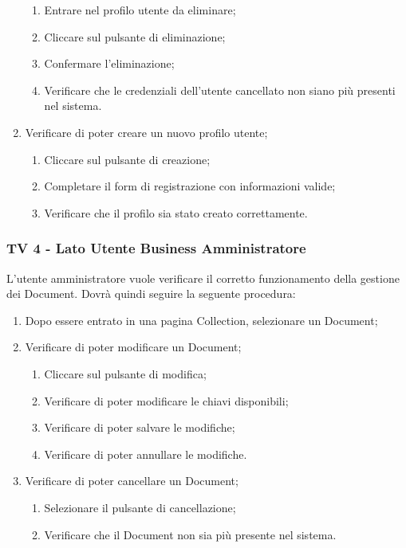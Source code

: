 \begin{enumerate}
\begin{enumerate}
\item Entrare nel profilo utente da eliminare;
\item Cliccare sul pulsante di eliminazione;
\item Confermare l'eliminazione;
\item Verificare che le credenziali dell'utente cancellato non siano più presenti nel sistema.
\end{enumerate}
\item Verificare di poter creare un nuovo profilo utente;
\begin{enumerate}
\item Cliccare sul pulsante di creazione;
\item Completare il form di registrazione con informazioni valide;
\item Verificare che il profilo sia stato creato correttamente.
\end{enumerate}
\end{enumerate}


\subsubsection{TV 4 - Lato Utente Business Amministratore}

L’utente amministratore vuole verificare il corretto funzionamento della gestione dei Document.
Dovrà quindi seguire la seguente procedura:


\begin{enumerate}
\item Dopo essere entrato in una pagina Collection, selezionare un Document;
\item Verificare di poter modificare un Document;
\begin{enumerate}
\item Cliccare sul pulsante di modifica;
\item Verificare di poter modificare le chiavi disponibili;
\item Verificare di poter salvare le modifiche;
\item Verificare di poter annullare le modifiche.
\end{enumerate}
\item Verificare di poter cancellare un Document;
\begin{enumerate}
\item Selezionare il pulsante di cancellazione;
\item Verificare che il Document non sia più presente nel sistema.
\end{enumerate}
\end{enumerate}


